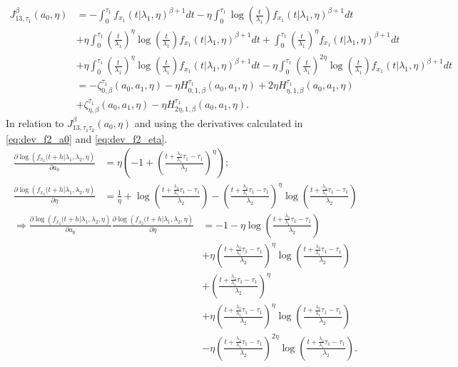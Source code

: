 \documentclass{article}
\begin{document}
\begin{align*}
J_{13,\tau_1}^{\beta}(a_0,\eta)&=-\int_{0}^{\tau_1}     f_{x_1}(t|\lambda_1,\eta)^{\beta+1}dt
-\eta\int_{0}^{\tau_1}\log\left(\frac{t}{\lambda_1}\right)     f_{x_1}(t|\lambda_1,\eta)^{\beta+1}dt
\\
&+ \eta\int_{0}^{\tau_1}\left(\frac{t}{\lambda_1}\right)^{\eta}     \log\left(\frac{t}{\lambda_1}\right)  f_{x_1}(t|\lambda_1,\eta)^{\beta+1}dt
+\int_{0}^{\tau_1}\left(\frac{t}{\lambda_1}\right)^{\eta}      f_{x_1}(t|\lambda_1,\eta)^{\beta+1}dt
\\
&+\eta \int_{0}^{\tau_1} \left(\frac{t}{\lambda_1}\right)^{\eta}    \log\left(\frac{t}{\lambda_1}\right)   f_{x_1}(t|\lambda_1,\eta)^{\beta+1}dt
-\eta \int_{0}^{\tau_1} \left(\frac{t}{\lambda_1}\right)^{2\eta}     \log\left(\frac{t}{\lambda_1}\right)  f_{x_1}(t|\lambda_1,\eta)^{\beta+1}dt
\\
&=-\zeta_{0,\beta}^{\tau_1}(a_0,a_1,\eta)
-\eta H_{0,1,\beta}^{\tau_1}(a_0,a_1,\eta)
+2\eta H_{ \eta,1,\beta}^{\tau_1}(a_0,a_1,\eta)
\\
&+\zeta_{\eta,\beta}^{\tau_1}(a_0,a_1,\eta)
-\eta H_{2\eta,1,\beta}^{\tau_1}(a_0,a_1,\eta).
\end{align*}
In relation to $J_{13,\tau_1\tau_2}^{\beta}(a_0,\eta)$ and using the derivatives calculated in  \eqref{eq:dev_f2_a0} and \eqref{eq:dev_f2_eta}.
\begin{align*}
\frac{\partial \log\left(f_{x_2}(t+h|\lambda_1,\lambda_2,\eta\right)}{\partial a_0}&=\eta\left(-1+\left(\frac{t+\frac{\lambda_2}{\lambda_1}\tau_1-\tau_1}{\lambda_2}\right)^{\eta}\right);
\\
\frac{\partial \log\left(f_{x_2}(t+h|\lambda_1,\lambda_2,\eta\right)}{\partial \eta}&=\frac{1}{\eta}+\log\left(\frac{t+\frac{\lambda_2}{\lambda_1}\tau_1-\tau_1}{\lambda_2}\right)-\left(\frac{t+\frac{\lambda_2}{\lambda_1}\tau_1-\tau_1}{\lambda_2}\right)^{\eta}\log\left(\frac{t+\frac{\lambda_2}{\lambda_1}\tau_1-\tau_1}{\lambda_2}\right)
\end{align*}
\begin{align*}
\Rightarrow  \frac{\partial \log\left(f_{x_2}(t+h|\lambda_1,\lambda_2,\eta\right)}{\partial a_0}\frac{\partial \log\left(f_{x_2}(t+h|\lambda_1,\lambda_2,\eta\right)}{\partial \eta}&=-1-\eta\log\left(\frac{t+\frac{\lambda_2}{\lambda_1}\tau_1-\tau_1}{\lambda_2}\right)
\\
&+\eta\left(\frac{t+\frac{\lambda_2}{\lambda_1}\tau_1-\tau_1}{\lambda_2}\right)^{\eta}\log\left(\frac{t+\frac{\lambda_2}{\lambda_1}\tau_1-\tau_1}{\lambda_2}\right)
\\
&+\left(\frac{t+\frac{\lambda_2}{\lambda_1}\tau_1-\tau_1}{\lambda_2}\right)^{\eta}
\\
&+\eta\left(\frac{t+\frac{\lambda_2}{\lambda_1}\tau_1-\tau_1}{\lambda_2}\right)^{\eta}\log\left(\frac{t+\frac{\lambda_2}{\lambda_1}\tau_1-\tau_1}{\lambda_2}\right)
\\
&-\eta\left(\frac{t+\frac{\lambda_2}{\lambda_1}\tau_1-\tau_1}{\lambda_2}\right)^{2\eta}\log\left(\frac{t+\frac{\lambda_2}{\lambda_1}\tau_1-\tau_1}{\lambda_2}\right).
\end{align*}
\end{document}
